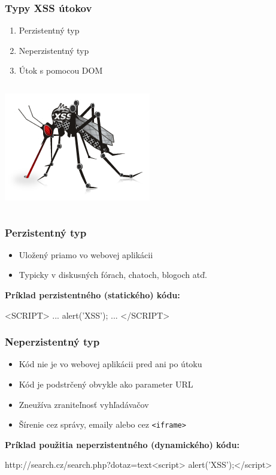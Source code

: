 \documentclass[hyperref={unicode}]{beamer}
\begin{document}
\begin{frame}
    \frametitle{Typy XSS útokov}
    
    \begin{enumerate}
        \item Perzistentný typ
        \item Neperzistentný typ
        \item Útok s pomocou DOM
    \end{enumerate}
    
    \begin{columns}
        \includegraphics[scale=0.5]{injection.jpg}
    \end{columns}
    
\end{frame}

\begin{frame}[fragile]
    \frametitle{Perzistentný typ}
    \begin{itemize}
        \item Uložený priamo vo webovej aplikácii
        \item Typicky v diskusných fórach, chatoch, blogoch atď.
    \end{itemize}
\pause
\textbf{Príklad perzistentného (statického) kódu:}
\begin{semiverbatim}

    <SCRIPT>
        ...
        alert('XSS');
        ...
    </SCRIPT>
\end{semiverbatim}
\end{frame}

\begin{frame}[fragile]
    \frametitle{Neperzistentný typ}
    \begin{itemize}
        \item Kód nie je vo webovej aplikácii pred ani po útoku
        \item Kód je podstrčený obvykle ako parameter URL
        \item Zneužíva zraniteľnosť vyhľadávačov
        \item Šírenie cez správy, emaily alebo cez \texttt{<iframe>}
    \end{itemize}
\pause
\textbf{Príklad použitia neperzistentného (dynamického) kódu:}
\begin{semiverbatim}
  http://search.cz/search.php?dotaz=text<script>
  alert('XSS');</script> 
\end{semiverbatim}
\end{frame}
\end{document}
